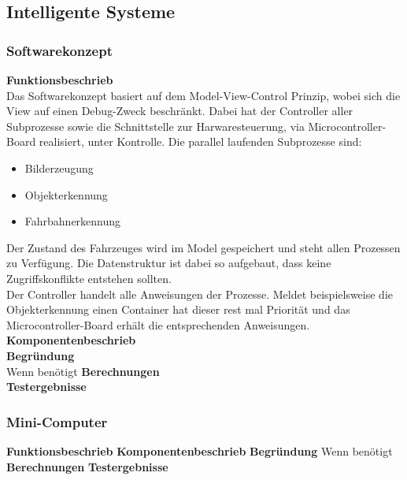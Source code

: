 \subsection{Intelligente Systeme}

\subsubsection{Softwarekonzept}
\textbf{Funktionsbeschrieb}\\[0.2cm]
Das Softwarekonzept basiert auf dem Model-View-Control Prinzip, wobei sich die View auf einen Debug-Zweck beschränkt. Dabei hat der Controller aller Subprozesse sowie die Schnittstelle zur Harwaresteuerung, via Microcontroller-Board realisiert, unter Kontrolle. Die parallel laufenden  Subprozesse sind:
\begin{itemize}
\item Bilderzeugung
\item Objekterkennung
\item Fahrbahnerkennung
\end{itemize}
Der Zustand des Fahrzeuges wird im Model gespeichert und steht allen Prozessen zu Verfügung. Die Datenstruktur ist dabei so aufgebaut, dass keine Zugriffskonflikte entstehen sollten.\\
Der Controller handelt alle Anweisungen der Prozesse. Meldet beispielsweise die Objekterkennung einen Container hat dieser rest mal Priorität und das Microcontroller-Board erhält die entsprechenden Anweisungen.\\[0.2cm]
\textbf{Komponentenbeschrieb}\\[0.2cm]
\textbf{Begründung}\\[0.2cm]
Wenn benötigt
\textbf{Berechnungen}\\[0.2cm]
\textbf{Testergebnisse}\\[0.2cm]

\subsubsection{Mini-Computer}
\textbf{Funktionsbeschrieb}
\textbf{Komponentenbeschrieb}
\textbf{Begründung}
Wenn benötigt
\textbf{Berechnungen}
\textbf{Testergebnisse}

